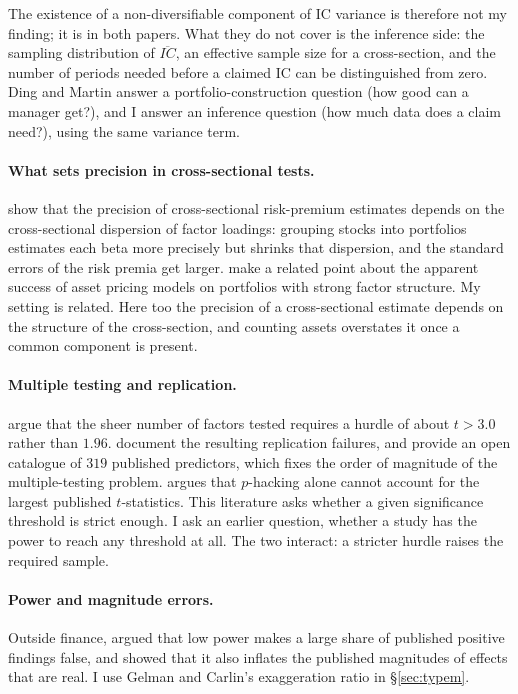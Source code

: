 \documentclass[11pt,a4paper]{article}
\begin{document}
The existence of a non-diversifiable component of IC variance is therefore not my
finding; it
is in both papers. What they do not cover is the inference side: the sampling
distribution of $\overline{IC}$, an effective sample size for a cross-section, and the
number of periods needed before a claimed IC can be distinguished from zero. Ding and
Martin answer a portfolio-construction question (how good can a manager get?), and I
answer an inference question (how much data does a claim need?), using the same
variance term.

\paragraph{What sets precision in cross-sectional tests.}
\citet{ang2020stocks} show that the precision of cross-sectional risk-premium estimates
depends on the cross-sectional dispersion of factor loadings: grouping stocks into
portfolios estimates each beta more precisely but shrinks that dispersion, and the
standard errors of the risk premia get larger. \citet{lewellen2010skeptical} make a
related point about the apparent success of asset pricing models on portfolios with
strong factor structure. My setting is related. Here too the precision of a
cross-sectional estimate depends on the structure of the cross-section, and counting
assets overstates it once a common component is present.

\paragraph{Multiple testing and replication.}
\citet{harvey2016cross} argue that the sheer number of factors tested requires a hurdle
of about $t > 3.0$ rather than $1.96$. \citet{hou2020replicating} document the resulting
replication failures, and \citet{chen2022opensource} provide an open catalogue of $319$
published predictors, which fixes the order of magnitude of the multiple-testing problem.
\citet{chen2021phacking} argues that $p$-hacking alone cannot account for the largest
published $t$-statistics. This literature asks whether a given significance threshold is
strict enough. I ask an earlier question, whether a study has the power to reach any
threshold at all. The two interact: a stricter hurdle raises the required sample.

\paragraph{Power and magnitude errors.}
Outside finance, \citet{ioannidis2005why} argued that low power makes a large share of
published positive findings false, and \citet{gelman2014beyond} showed that it also
inflates the published magnitudes of effects that are real. I use Gelman and Carlin's
exaggeration ratio in \S\ref{sec:typem}.
\end{document}
